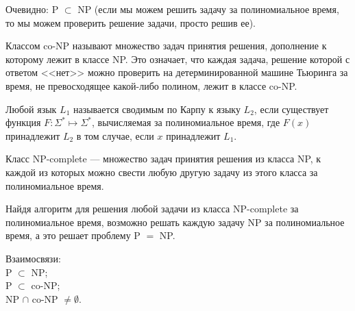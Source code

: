     \begin{Rem}
        Очевидно: P $\subset$ NP (если мы можем решить задачу за полиномиальное время, то мы можем проверить решение задачи, просто решив ее).
    \end{Rem}
    
    \begin{Def}
        Классом co-NP называют множество задач принятия решения, дополнение к которому лежит в классе NP. Это означает, что каждая задача, решение которой с ответом <<нет>> можно проверить на детерминированной машине Тьюринга за время, не превосходящее какой-либо полином, лежит в классе co-NP.
    \end{Def}
    
    
    \begin{Def}
        Любой язык $L_1$ называется сводимым по Карпу к языку $L_2$, если существует функция $F\colon \Sigma ^{*}\mapsto \Sigma ^{*}$, вычисляемая за полиномиальное время, где $F(x)$ принадлежит $L_2$ в том случае, если $x$ принадлежит $L_1$. 
    \end{Def}
    
    \begin{Def}
        Класс NP-complete --- множество задач принятия решения из класса NP, к каждой из которых можно свести $\textbf{любую}$ другую задачу из этого класса за полиномиальное время.
    \end{Def}
    
    \begin{Rem}
        Найдя алгоритм для решения любой задачи из класса NP-complete за полиномиальное время, возможно решать каждую задачу NP за полиномиальное время, а это решает проблему P $=$ NP.
    \end{Rem}
    
    
    \begin{Rem}
        Взаимосвязи:\\
        P $\subset$ NP;\\
        P $\subset$ co-NP;\\
        NP $\cap$ co-NP $\neq \emptyset$.
    \end{Rem}
    
        
